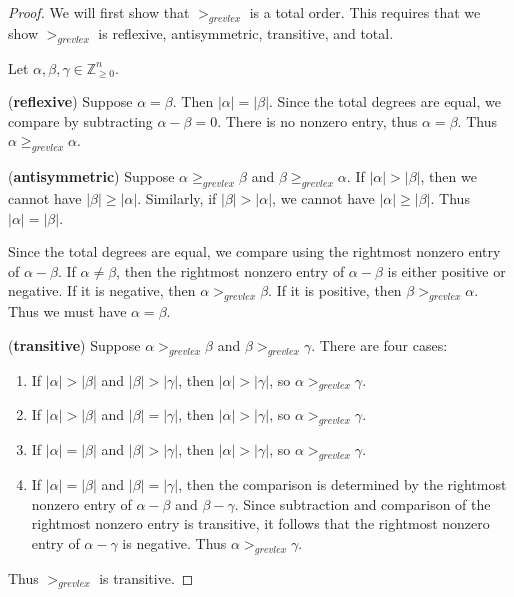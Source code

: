 \begin{proof}
    We will first show that $>_{grevlex}$ is a total order.
    This requires that we show $>_{grevlex}$ is reflexive, antisymmetric, transitive, and total.

    Let $\alpha, \beta, \gamma \in \mathbb{Z}_{\ge 0}^n$.

    (\textbf{reflexive})  
    Suppose $\alpha = \beta$.  
    Then $|\alpha| = |\beta|$.  
    Since the total degrees are equal, we compare by subtracting 
    $\alpha - \beta = 0$.  
    There is no nonzero entry, thus $\alpha = \beta$.  
    Thus $\alpha \ge_{grevlex} \alpha$.

    (\textbf{antisymmetric})  
    Suppose $\alpha \ge_{grevlex} \beta$ and $\beta \ge_{grevlex} \alpha$.  
    If $|\alpha| > |\beta|$, then we cannot have $|\beta| \ge |\alpha|$.  
    Similarly, if $|\beta| > |\alpha|$, we cannot have $|\alpha| \ge |\beta|$.  
    Thus $|\alpha| = |\beta|$.  

    Since the total degrees are equal, we compare using the rightmost nonzero
    entry of $\alpha - \beta$.  
    If $\alpha \ne \beta$, then the rightmost nonzero entry of 
    $\alpha - \beta$ is either positive or negative.  
    If it is negative, then $\alpha >_{grevlex} \beta$.  
    If it is positive, then $\beta >_{grevlex} \alpha$.  
    Thus we must have $\alpha = \beta$.

    (\textbf{transitive})  
    Suppose $\alpha >_{grevlex} \beta$ and $\beta >_{grevlex} \gamma$.  
    There are four cases:
    \begin{enumerate}
        \item If $|\alpha| > |\beta|$ and $|\beta| > |\gamma|$, then  
        $|\alpha| > |\gamma|$, so $\alpha >_{grevlex} \gamma$.

        \item If $|\alpha| > |\beta|$ and $|\beta| = |\gamma|$, then  
        $|\alpha| > |\gamma|$, so $\alpha >_{grevlex} \gamma$.

        \item If $|\alpha| = |\beta|$ and $|\beta| > |\gamma|$, then  
        $|\alpha| > |\gamma|$, so $\alpha >_{grevlex} \gamma$.

        \item If $|\alpha| = |\beta|$ and $|\beta| = |\gamma|$, then  
        the comparison is determined by the rightmost nonzero entry of 
        $\alpha - \beta$ and $\beta - \gamma$.  
        Since subtraction and comparison of the rightmost nonzero entry 
        is transitive, it follows that the rightmost nonzero entry of 
        $\alpha - \gamma$ is negative.  
        Thus $\alpha >_{grevlex} \gamma$.
    \end{enumerate}
    Thus $>_{grevlex}$ is transitive.


\end{proof}

